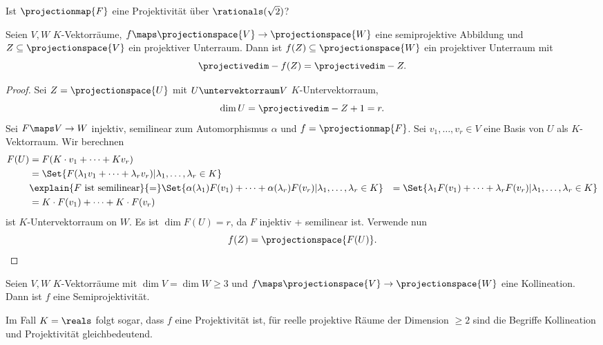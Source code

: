 \begin{frage*}
  Ist \( \projectionmap{F} \) eine Projektivität über \( \rationals(\sqrt{2}) \)?
\end{frage*}
\begin{lemma}
  Seien \( V,W \) \( K \)-Vektorräume, \( f\maps \projectionspace{V}\to \projectionspace{W} \) eine semiprojektive Abbildung und \( Z\subseteq \projectionspace{V} \) ein projektiver Unterraum. Dann ist \( f(Z)\subseteq \projectionspace{W} \) ein projektiver Unterraum mit 
  \begin{equation*}
    \projectivedim-{f(Z)}=\projectivedim-{Z}.
  \end{equation*}
\end{lemma}
\begin{proof}
  Sei \( Z=\projectionspace{U} \) mit \( U\untervektorraum V \) \( K \)-Untervektorraum,
  \begin{equation*}
    \dim{U}=\projectivedim-{Z}+1=r.
  \end{equation*}
  Sei \( F\maps V\to W \) injektiv, semilinear zum Automorphismus \( \alpha \) und \( f=\projectionmap{F} \). Sei \( v_1,\dotsc,v_r\in V \) eine Basis von \( U \) als \( K \)-Vektorraum. Wir berechnen
  \begin{align*}
    F(U)&=F(K\cdot v_1+\dotsb+K v_r)\\
    &=\Set{F(\lambda_1 v_1+\dotsb+\lambda_r v_r)|\lambda_1,\dotsc,\lambda_r\in K}\\
    &\explain{F \text{ ist semilinear}}{=}\Set{\alpha(\lambda_1)F(v_1)+\dotsb+\alpha(\lambda_r)F(v_r)|\lambda_1,\dotsc,\lambda_r\in K}
    &=\Set{\lambda_1 F(v_1)+\dotsb+\lambda_r F(v_r)|\lambda_1,\dotsc,\lambda_r\in K}\\
    &=K\cdot F(v_1)+\dotsb+K\cdot F(v_r)
  \end{align*}
  ist \( K \)-Untervektorraum on \( W \). Es ist \( \dim{F(U)}=r \), da \( F \) injektiv + semilinear ist. Verwende nun
  \begin{equation*}
    f(Z)=\projectionspace{F(U)}.
  \end{equation*}  
\end{proof}
\begin{satz}\label{hauptsatz_projektive_geometrie}
  Seien \( V,W \) \( K \)-Vektorräume mit \( \dim{V}=\dim{W}\geq 3 \) und \( f\maps \projectionspace{V}\to\projectionspace{W} \) eine Kollineation. Dann ist \( f \) eine Semiprojektivität.
\end{satz}
\begin{bemerkung*}
  Im Fall \( K=\reals \) folgt sogar, dass \( f \) eine Projektivität ist, \dh für reelle projektive Räume der Dimension \( \geq 2 \) sind die Begriffe Kollineation und Projektivität gleichbedeutend.
\end{bemerkung*}